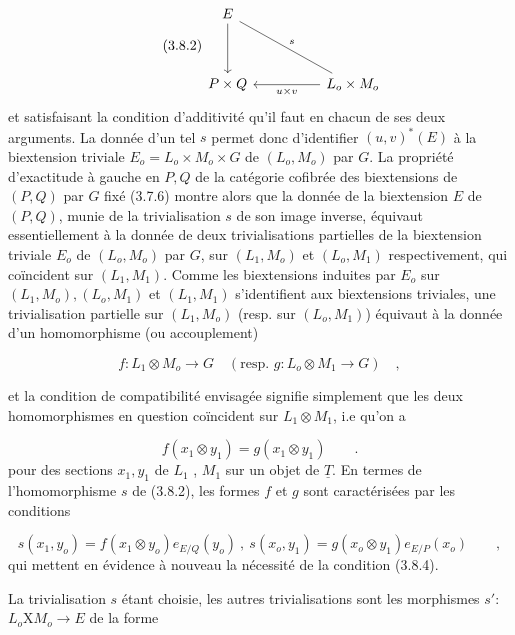 \begin{equation}\tag{3.8.2}
\begin{tikzcd}[column sep=huge, row sep=huge]
E \arrow[d] \arrow[dr, dash, "s"] & \\
P \times Q & L_o \times M_o \arrow[l, "u \times v"]
\end{tikzcd}
\end{equation}
et satisfaisant la condition d'additivité qu'il faut en chacun de ses deux arguments. La donnée d'un tel $s$ permet donc d'identifier $(u,v)^{*}(E)$ à la biextension triviale $E_o = L_o \times M_o \times G$ de $(L_o,M_o)$ par $G$. La propriété d'exactitude à gauche en $P,Q$ de la catégorie cofibrée des biextensions de $(P,Q)$ par $G$ fixé (3.7.6) montre alors que la donnée de la biextension $E$ de $(P,Q)$, munie de la trivialisation $s$ de son image inverse, équivaut essentiellement à la donnée de deux trivialisations partielles de la biextension triviale $E_o$ de $(L_o,M_o)$ par $G$, sur $(L_1,M_o)$ et $(L_o,M_1)$ respectivement, qui coïncident sur $(L_1,M_1)$. Comme les biextensions induites par $E_o$ sur $(L_1,M_o),(L_o,M_1)$ et $(L_1,M_1)$ s'identifient aux biextensions triviales, une trivialisation partielle sur $(L_1,M_o)$ (resp. sur $(L_o,M_1)$) équivaut à la donnée d'un homomorphisme (ou accouplement)

\begin{equation}\tag{3.8.3}
f : L_1 \otimes M_o \longrightarrow G \quad (\text{resp. } g: L_o \otimes M_1 \longrightarrow G) \quad ,
\end{equation}

et la condition de compatibilité envisagée signifie simplement que les deux homomorphismes en question coïncident sur $L_1 \otimes M_1$, i.e qu'on a

\begin{equation}\tag{3.8.4}
f(x_1 \otimes y_1) = g(x_1 \otimes y_1) \qquad .
\end{equation}
pour des sections $x_1,y_1$ de $L_1$ , $M_1$ sur un objet de $\underline{T}$. En termes de l'homomorphisme $s$ de (3.8.2), les formes $f$ et $g$ sont caractérisées  par les conditions

\begin{equation}\tag{3.8.5}
s(x_1,y_o) = f(x_1 \otimes y_o) e_{E/Q}(y_o) \ , \ s(x_o,y_1) = g(x_o \otimes y_1) e_{E/P}(x_o) \qquad ,
\end{equation}
qui mettent en évidence à nouveau la nécessité de la condition (3.8.4).

La trivialisation $s$ étant choisie, les autres trivialisations sont les morphismes $s'$: $L_o \mathrm{X} M_o \longrightarrow E$ de la forme

